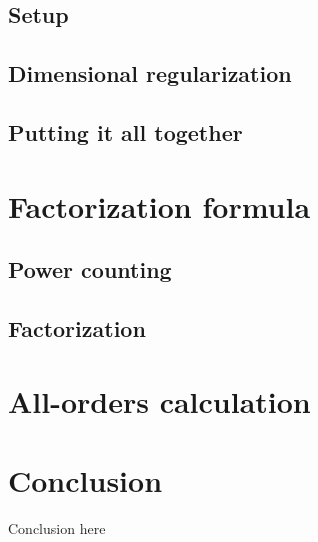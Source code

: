 \documentclass[12pt,twoside]{reedthesis}
\begin{document}
	\section{Setup}

	\section{Dimensional regularization}

	\section{Putting it all together}


\chapter{Factorization formula}

	\section{Power counting}

	\section{Factorization}


\chapter{All-orders calculation}
	

\chapter*{Conclusion}
\setcounter{chapter}{4}
\setcounter{section}{0}
	
	Conclusion here 




\end{document}
